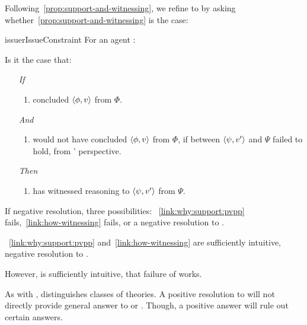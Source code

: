 \begin{note}
  Following~\autoref{prop:support-and-witnessing}, we refine \issueInclusion{} to \issueConstraint{} by asking whether~\autoref{prop:support-and-witnessing} is the case:

  \begin{restatable}[\issueConstraint{}]{issue}{rIssueConstraint}
    \label{issue:has-witnessed}
    For an agent \vAgent{}:

    Is it the case that:

    \begin{enumerate}
    \item[\emph{If}]
      \begin{enumerate}[label=\alph*., ref=(\alph*)]
      \item \vAgent{} concluded \(\langle \phi, v \rangle\) from \(\Phi\).
      \end{enumerate}
    \item[\emph{And}]
      \begin{enumerate}[label=\alph*., ref=(\alph*), resume]
      \item
        \vAgent{} would not have concluded \(\langle \phi, v \rangle\) from \(\Phi\), if \support{} between \(\langle \psi, v' \rangle\) and \(\Psi\) failed to hold, from \vAgent{}' perspective.
      \end{enumerate}
    \item[\emph{Then}]
      \begin{enumerate}[label=\alph*., ref=(\alph*), resume]
      \item
        \vAgent{} has witnessed reasoning to \(\langle \psi, v' \rangle\) from \(\Psi\).
      \end{enumerate}
    \end{enumerate}
  \end{restatable}

  If negative resolution, three possibilities:
  ~\autoref{link:why:support:pvpp} fails,~\autoref{link:how-witnessing} fails, or a negative resolution to \issueInclusion{}.

  ~\autoref{link:why:support:pvpp} and~\autoref{link:how-witnessing} are sufficiently intuitive, negative resolution to \issueInclusion{}.

  However, \issueConstraint{} is sufficiently intuitive, that failure of \issueConstraint{} works.
\end{note}

\begin{note}
  As with \issueInclusion{}, \issueConstraint{} distinguishes classes of theories.
  A positive resolution to \issueInclusion{} will not directly provide general answer to \qWhy{} or \qHow{}.
  Though, a positive answer will rule out certain answers.
\end{note}


